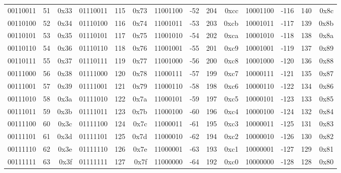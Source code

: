 \begin{center}
{\begin{tabular}{| rrr | rrr | rrrr | rrrr |}
			00110011 & 51 & 0x33 & 01110011 & 115 & 0x73 & 11001100 & -52 & 204 & 0xcc & 10001100 & -116 & 140 & 0x8c \\
			00110100 & 52 & 0x34 & 01110100 & 116 & 0x74 & 11001011 & -53 & 203 & 0xcb & 10001011 & -117 & 139 & 0x8b \\
			00110101 & 53 & 0x35 & 01110101 & 117 & 0x75 & 11001010 & -54 & 202 & 0xca & 10001010 & -118 & 138 & 0x8a \\
			00110110 & 54 & 0x36 & 01110110 & 118 & 0x76 & 11001001 & -55 & 201 & 0xc9 & 10001001 & -119 & 137 & 0x89 \\
			00110111 & 55 & 0x37 & 01110111 & 119 & 0x77 & 11001000 & -56 & 200 & 0xc8 & 10001000 & -120 & 136 & 0x88 \\
			\hline
			00111000 & 56 & 0x38 & 01111000 & 120 & 0x78 & 11000111 & -57 & 199 & 0xc7 & 10000111 & -121 & 135 & 0x87 \\
			00111001 & 57 & 0x39 & 01111001 & 121 & 0x79 & 11000110 & -58 & 198 & 0xc6 & 10000110 & -122 & 134 & 0x86 \\
			00111010 & 58 & 0x3a & 01111010 & 122 & 0x7a & 11000101 & -59 & 197 & 0xc5 & 10000101 & -123 & 133 & 0x85 \\
			00111011 & 59 & 0x3b & 01111011 & 123 & 0x7b & 11000100 & -60 & 196 & 0xc4 & 10000100 & -124 & 132 & 0x84 \\
			00111100 & 60 & 0x3c & 01111100 & 124 & 0x7c & 11000011 & -61 & 195 & 0xc3 & 10000011 & -125 & 131 & 0x83 \\
			00111101 & 61 & 0x3d & 01111101 & 125 & 0x7d & 11000010 & -62 & 194 & 0xc2 & 10000010 & -126 & 130 & 0x82 \\
			00111110 & 62 & 0x3e & 01111110 & 126 & 0x7e & 11000001 & -63 & 193 & 0xc1 & 10000001 & -127 & 129 & 0x81 \\
			00111111 & 63 & 0x3f & 01111111 & 127 & 0x7f & 11000000 & -64 & 192 & 0xc0 & 10000000 & -128 & 128 & 0x80 \\

			
			
			\hline
	\end{tabular}}
	
	
	\end{center}
\clearpage

